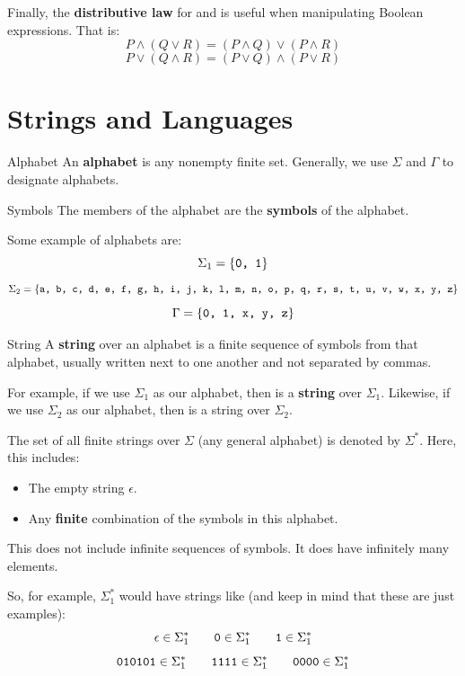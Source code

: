\documentclass[letterpaper]{article}
\begin{document}
Finally, the \textbf{distributive law} for  and  is useful when manipulating Boolean expressions. That is: 
\[P \land (Q \lor R) = (P \land Q) \lor (P \land R)\]
\[P \lor (Q \land R) = (P \lor Q) \land (P \lor R)\]





\newpage 
\section{Strings and Languages}
\begin{definition}{Alphabet}{}
    An \textbf{alphabet} is any nonempty finite set. Generally, we use $\Sigma$ and $\Gamma$ to designate alphabets.
\end{definition}

\begin{definition}{Symbols}{}
    The members of the alphabet are the \textbf{symbols} of the alphabet.
\end{definition}

Some example of alphabets are: 
\[\Sigma_1 = \{\texttt{0, 1}\}\]
\[\Sigma_2 = \{\texttt{a, b, c, d, e, f, g, h, i, j, k, l, m, n, o, p, q, r, s, t, u, v, w, x, y, z}\}\]
\[\Gamma = \{\texttt{0, 1, x, y, z}\}\]

\begin{definition}{String}{}
    A \textbf{string} over an alphabet is a finite sequence of symbols from that alphabet, usually written next to one another and not separated by commas. 
\end{definition}
For example, if we use $\Sigma_1$ as our alphabet, then  is a \textbf{string} over $\Sigma_1$. Likewise, if we use $\Sigma_2$ as our alphabet, then  is a string over $\Sigma_2$. 

\bigskip

The set of all finite strings over $\Sigma$ (any general alphabet) is denoted by $\Sigma^*$. Here, this includes:
\begin{itemize}
    \item The empty string $\epsilon$.
    \item Any \textbf{finite} combination of the symbols in this alphabet.
\end{itemize}
This does not include infinite sequences of symbols. It does have infinitely many elements. 

\bigskip

So, for example, $\Sigma_{1}^{*}$ would have strings like (and keep in mind that these are just examples): 
\[\epsilon \in \Sigma_{1}^{*} \qquad \texttt{0} \in \Sigma_{1}^{*} \qquad \texttt{1} \in \Sigma_{1}^{*}\]
\[\texttt{010101} \in \Sigma_{1}^{*} \qquad \texttt{1111} \in \Sigma_{1}^{*} \qquad \texttt{0000} \in \Sigma_{1}^{*}\]
\end{document}
